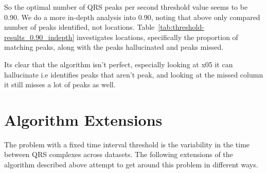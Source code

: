 So the optimal number of QRS peaks per second threshold value seems to be 0.90. We do a more in-depth analysis into 0.90, noting that above 
only compared number of peaks identified, not locations. Table~\ref{tab:threshold-results_0.90_indepth} investigates locations, specifically the proportion of matching peaks, 
along with the peaks hallucinated and peaks missed.  
\begin{table}[H]
    \centering
    \caption{In depth analysis into 0.90 threshold, proportion of peaks found, peaks hallucinated and peaks 
    missed}
    \label{tab:threshold-results_0.90_indepth}


\end{table}
Its clear that the algorithm isn't perfect, especially looking at x05 it can hallucinate i.e identifies
peaks that aren't peak, and looking at the missed column it still misses a lot of peaks as well.  

\section{Algorithm Extensions}
The problem with a fixed time interval threshold is the variability in the time between QRS complexes across
datasets. The following extensions of the algorithm described above attempt to get around this problem 
in different ways. \\


